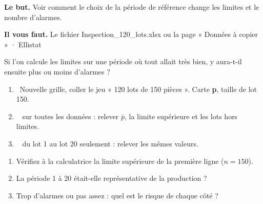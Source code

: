 \documentclass[10pt,a4paper]{article}
\begin{document}
\thispagestyle{fancy}
\begin{tcolorbox}[boite]\textbf{Le but.} Voir comment le choix de la période de référence change les limites et le nombre d'alarmes.\par\textbf{Il vous faut.} Le fichier Inspection\_120\_lots.xlsx ou la page « Données à copier » · Ellistat\end{tcolorbox}
\begin{tcolorbox}[pred]Si l'on calcule les limites sur une période où tout allait très bien, y aura-t-il ensuite plus ou moins d'alarmes ?\reponse\end{tcolorbox}
\begin{enumerate}[label=\textcolor{cyan}{\textbf{\arabic*.}},leftmargin=15pt,itemsep=1.5pt]
\item \tagE\ Nouvelle grille, coller le jeu « 120 lots de 150 pièces ». Carte \textbf{p}, taille de lot 150.
\item \tagE\  sur toutes les données : relever $\bar p$, la limite supérieure et les lots hors limites.
\item \tagE\  du lot 1 au lot 20 seulement : relever les mêmes valeurs.
\end{enumerate}
\par
{}
\begin{enumerate}[label=\textcolor{cyan}{\textbf{Q\arabic*.}},leftmargin=22pt]
\item Vérifiez à la calculatrice la limite supérieure de la première ligne ($n = 150$).\reponse[1]
\item La période 1 à 20 était-elle représentative de la production ?\reponse[2]
\item Trop d'alarmes ou pas assez : quel est le risque de chaque côté ?\reponse[2]
\end{enumerate}
\end{document}
